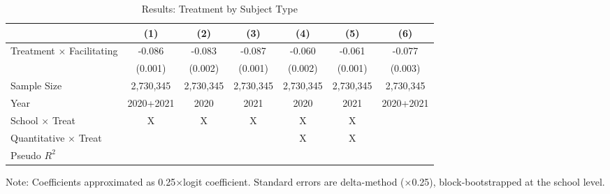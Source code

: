 \begin{table}[!h]
\centering
\caption{Results: Treatment by Subject Type}
\centering
\begin{threeparttable}
\begin{tabular}[t]{lcccccc}
\toprule
 & (1) & (2) & (3) & (4) & (5) & (6)\\
\midrule
Treatment $\times$ Facilitating & -0.086 & -0.083 & -0.087 & -0.060 & -0.061 & -0.077\\
 & (0.001) & (0.002) & (0.001) & (0.002) & (0.001) & (0.003)\\
\midrule
Sample Size & 2,730,345 & 2,730,345 & 2,730,345 & 2,730,345 & 2,730,345 & 2,730,345\\
Year & 2020+2021 & 2020 & 2021 & 2020 & 2021 & 2020+2021\\
School $\times$ Treat & X & X & X & X & X & \\
\addlinespace
Quantitative $\times$ Treat &  &  &  & X & X & \\
Pseudo $R^{2}$ &  &  &  &  &  & \\
\bottomrule
\end{tabular}
\begin{tablenotes}
\item Note: Coefficients approximated as 0.25×logit coefficient. Standard errors are delta-method (×0.25), block‐bootstrapped at the school level.
\end{tablenotes}
\end{threeparttable}
\end{table}